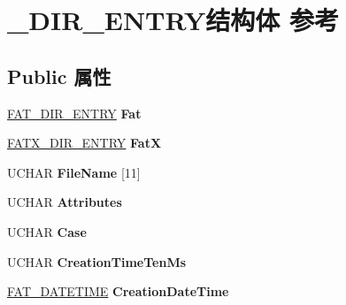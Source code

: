 \hypertarget{union___d_i_r___e_n_t_r_y}{}\section{\+\_\+\+D\+I\+R\+\_\+\+E\+N\+T\+R\+Y结构体 参考}
\label{union___d_i_r___e_n_t_r_y}
\subsection*{Public 属性}
\begin{DoxyCompactItemize}
\item 
\mbox{\label{union___d_i_r___e_n_t_r_y_a4e59ba49dc81255f436c4b0b9c2ca5c8}} 
\hyperlink{struct___f_a_t_dir_entry}{F\+A\+T\+\_\+\+D\+I\+R\+\_\+\+E\+N\+T\+RY} {\bfseries Fat}
\item 
\mbox{\label{union___d_i_r___e_n_t_r_y_aa79082294c0541907b208cfeac715ba4}} 
\hyperlink{struct___f_a_t_x_dir_entry}{F\+A\+T\+X\+\_\+\+D\+I\+R\+\_\+\+E\+N\+T\+RY} {\bfseries FatX}
\item 
\mbox{\label{union___d_i_r___e_n_t_r_y_a5ff70a611b121b351074feb9a7dbb06e}} 
U\+C\+H\+AR {\bfseries File\+Name} \mbox{[}11\mbox{]}
\item 
\mbox{\label{union___d_i_r___e_n_t_r_y_ae1275149fa6b6884eea74ff2b300f884}} 
U\+C\+H\+AR {\bfseries Attributes}
\item 
\mbox{\label{union___d_i_r___e_n_t_r_y_abe3d2a788a4c95df7f4dffba2b5b5f82}} 
U\+C\+H\+AR {\bfseries Case}
\item 
\mbox{\label{union___d_i_r___e_n_t_r_y_a289a285afbecc98ad0f4b2b1c8a6eb03}} 
U\+C\+H\+AR {\bfseries Creation\+Time\+Ten\+Ms}
\item 
\mbox{\label{union___d_i_r___e_n_t_r_y_a671f18ba635c8570d18ad49c9fd1fa0a}} 
\hyperlink{struct___f_a_t___d_a_t_e_t_i_m_e}{F\+A\+T\+\_\+\+D\+A\+T\+E\+T\+I\+ME} {\bfseries Creation\+Date\+Time}
\item 
\mbox{\label{union___d_i_r___e_n_t_r_y_a068ca18a07b998e65291af53eac1f66f}} 

\end{DoxyCompactItemize}
